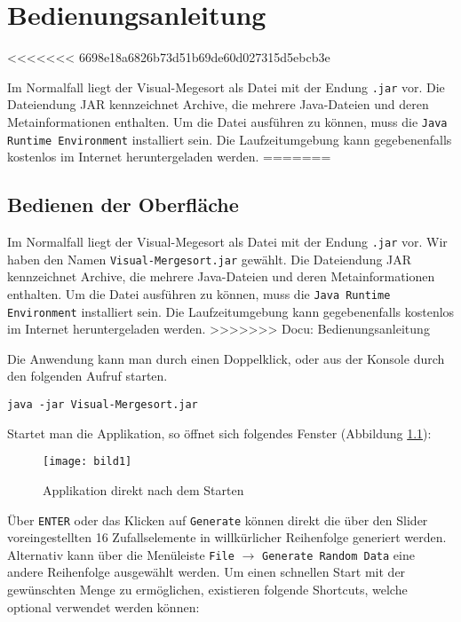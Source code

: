 \chapter{Bedienungsanleitung}\label{chap:bedienungsanleitung}
<<<<<<< 6698e18a6826b73d51b69de60d027315d5ebcb3e

Im Normalfall liegt der Visual-Megesort als Datei mit der Endung \texttt{.jar} vor. Die Dateiendung JAR kennzeichnet Archive, die mehrere Java-Dateien und deren Metainformationen enthalten. Um die Datei ausführen zu können, muss die \texttt{Java Runtime Environment} installiert sein. Die Laufzeitumgebung kann gegebenenfalls kostenlos im Internet heruntergeladen werden.
=======
\section{Bedienen der Oberfläche}
Im Normalfall liegt der Visual-Megesort als Datei mit der Endung \texttt{.jar} vor. Wir haben den Namen \texttt{Visual-Mergesort.jar} gewählt. Die Dateiendung JAR kennzeichnet Archive, die mehrere Java-Dateien und deren Metainformationen enthalten. Um die Datei ausführen zu können, muss die \texttt{Java Runtime Environment} installiert sein. Die Laufzeitumgebung kann gegebenenfalls kostenlos im Internet heruntergeladen werden.
>>>>>>> Docu: Bedienungsanleitung

Die Anwendung kann man durch einen Doppelklick, oder aus der Konsole durch den folgenden Aufruf starten.

\begin{verbatim}
java -jar Visual-Mergesort.jar
\end{verbatim}

Startet man die Applikation, so öffnet sich folgendes Fenster (Abbildung \ref{figure:start-app}):

\begin{figure}[!htb]
    \centering
      \texttt{[image: bild1]}
    \caption{Applikation direkt nach dem Starten}
    \label{figure:start-app}
\end{figure}

Über \texttt{ENTER} oder das Klicken auf \texttt{Generate} können direkt die über den Slider voreingestellten 16 Zufallselemente in willkürlicher Reihenfolge generiert werden. Alternativ kann über die Menüleiste \texttt{File} $\rightarrow$ \texttt{Generate Random Data} eine andere Reihenfolge ausgewählt werden. Um einen schnellen Start mit der gewünschten Menge zu ermöglichen, existieren folgende Shortcuts, welche optional verwendet werden können:

